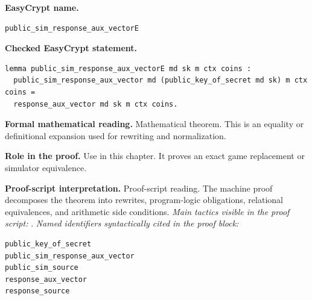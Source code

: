\begin{formaltheorem}
\noindent\textbf{EasyCrypt name.}
\begin{lstlisting}[language=EasyCrypt,basicstyle=\ttfamily\scriptsize]
public_sim_response_aux_vectorE
\end{lstlisting}
\noindent\textbf{Checked EasyCrypt statement.}
\begin{lstlisting}[language=EasyCrypt,basicstyle=\ttfamily\scriptsize]
lemma public_sim_response_aux_vectorE md sk m ctx coins :
  public_sim_response_aux_vector md (public_key_of_secret md sk) m ctx coins =
  response_aux_vector md sk m ctx coins.
\end{lstlisting}
\noindent\textbf{Formal mathematical reading.}
Mathematical theorem. This is an equality or definitional expansion used for rewriting and normalization.

\noindent\textbf{Role in the proof.}
Use in this chapter. It proves an exact game replacement or simulator equivalence.

\noindent\textbf{Proof-script interpretation.}
Proof-script reading. The machine proof decomposes the theorem into rewrites, program-logic obligations, relational equivalences, and arithmetic side conditions.
\emph{Main tactics visible in the proof script:} .
\emph{Named identifiers syntactically cited in the proof block:}
\begin{lstlisting}[language=EasyCrypt,basicstyle=\ttfamily\scriptsize]
public_key_of_secret
public_sim_response_aux_vector
public_sim_source
response_aux_vector
response_source
\end{lstlisting}

\end{formaltheorem}

